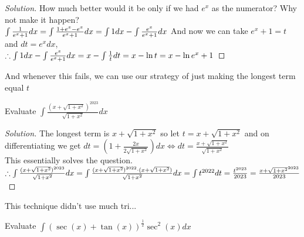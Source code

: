 \begin{proof}
    [Solution]
    How much better would it be only if we had $e^x$ as the numerator? Why not make it happen?\\
    $
    \int \frac{1}{e^x+1}dx\\
    =\int \frac{1+e^x-e^x}{e^x+1}dx\\
    =\int 1 dx - \int \frac{e^x}{e^x+1}dx$
    And now we can take $e^x+1=t$ and $dt=e^x dx$,\\
    $ \therefore \int 1 dx - \int \frac{e^x}{e^x+1}dx\\
    = x - \int \frac{1}{t}dt\\
    = x-\ln{t}\\
    = x-\ln{e^x+1}$
\end{proof}
And whenever this fails, we can use our strategy of just making the longest term equal $t$\\
\begin{example}
    Evaluate $\int \frac{(x+\sqrt{1+x^2})^{2023}}{\sqrt{1+x^2}}dx$
\end{example}
\begin{proof}
    [Solution]
    The longest term is $x+\sqrt{1+x^2}$ so let $t=x+\sqrt{1+x^2}$ and on differentiating we get $dt=(1+\frac{2x}{2\sqrt{1+x^2}})dx \iff dt=\frac{x+\sqrt{1+x^2}}{\sqrt{1+x^2}}$\\
    This essentially solves the question.\\
    $\therefore \int \frac{(x+\sqrt{1+x^2})^{2023}}{\sqrt{1+x^2}}dx\\
    = \int \frac{(x+\sqrt{1+x^2})^{2022} \cdot (x+\sqrt{1+x^2})}{\sqrt{1+x^2}}dx\\
    = \int t^{2022} dt\\
    = \frac{t^{2023}}{2023}\\
    = \frac{{x+\sqrt{1+x^2}}^{2023}}{2023}$
\end{proof}
This technique didn't use much tri...\\
\begin{example}
    Evaluate $\int (\sec(x)+\tan(x))^{\frac{1}{2}} \sec^2(x) dx$
\end{example}

